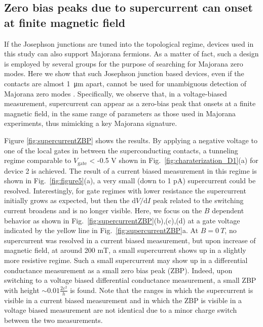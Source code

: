 \subsection{Zero bias peaks due to supercurrent can onset at finite magnetic field}

If the Josephson junctions are tuned into the topological regime, devices used in this study can also support Majorana fermions.
As a matter of fact, such a design is employed by several groups for the purpose of searching for Majorana zero modes.
Here we show that such Josephson junction based devices, even if the contacts are almost \SI{1}{\micro \meter} apart, cannot be used for unambiguous detection of Majorana zero modes \cite{Deng2012, Deng2014, Finck2013}.
Specifically, we observe that, in a voltage-biased measurement, supercurrent can appear as a zero-bias peak that onsets at a finite magnetic field, in the same range of parameters as those used in Majorana experiments, thus mimicking a key Majorana signature.

Figure \ref{fig:supercurrentZBP} shows the results.
By applying a negative voltage to one of the local gates in between the superconducting contacts, a tunneling regime comparable to $V_\mathrm{gate}$ < -0.5 V shown in Fig.~\ref{fig:charaterization_D1}(a) for device 2 is achieved.
The result of a current biased measurement in this regime is shown in Fig.~\ref{fig:figure5}(a), a very small (down to 1 pA) supercurrent could be resolved.
Interestingly, for gate regimes with lower resistance the supercurrent initially grows as expected, but then the $\mathrm{d}V/\mathrm{d}I$ peak related to the switching current broadens and is no longer visible.
Here, we focus on the $B$ dependent behavior as shown in Fig.~\ref{fig:supercurrentZBP}(b),(c),(d) at a gate voltage indicated by the yellow line in Fig.~\ref{fig:supercurrentZBP}a.
At $B=\SI{0}{T}$, no supercurrent was resolved in a current biased measurement, but upon increase of magnetic field, at around 200 mT, a small supercurrent shows up in a slightly more resistive regime.
Such a small supercurrent may show up in a differential conductance measurement as a small zero bias peak (ZBP).
Indeed, upon switching to a voltage biased differential conductance measurement, a small ZBP with height $\sim 0.01\frac{2e^2}{h}$ is found.
Note that the ranges in which the supercurrent is visible in a current biased measurement and in which the ZBP is visible in a voltage biased measurement are not identical due to a minor charge switch between the two measurements.

